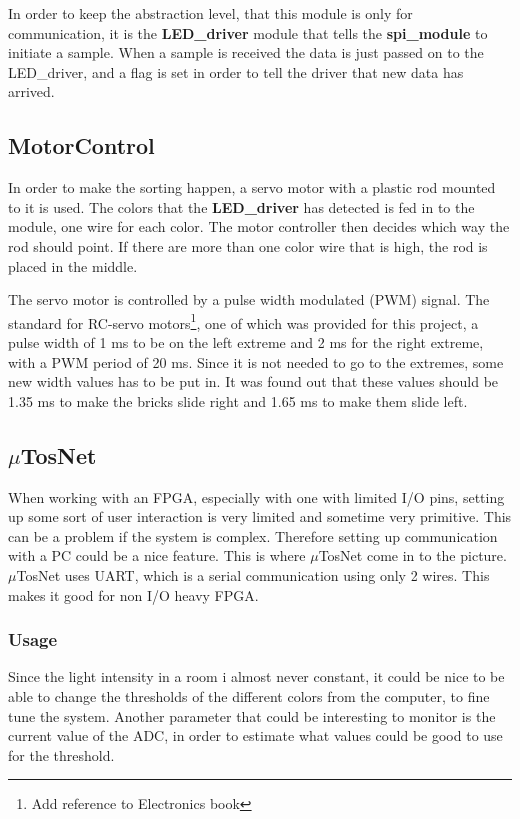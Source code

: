 In order to keep the abstraction level, that this module is only for communication, it is the \textbf{LED\_driver} module that tells the \textbf{spi\_module} to initiate a sample. When a sample is received the data is just passed on to the LED\_driver, and a flag is set in order to tell the driver that new data has arrived.

\subsection{MotorControl}
In order to make the sorting happen, a servo motor with a plastic rod mounted to it is used. The colors that the \textbf{LED\_driver} has detected is fed in to the module, one wire for each color. The motor controller then decides which way the rod should point. If there are more than one color wire that is high, the rod is placed in the middle. 

The servo motor is controlled by a pulse width modulated (PWM) signal. The standard for RC-servo motors\footnote{Add reference to Electronics book}, one of which was provided for this project, a pulse width of 1 ms to be on the left extreme and 2 ms for the right extreme, with a PWM period of 20 ms. Since it is not needed to go to the extremes, some new width values has to be put in. It was found out that these values should be 1.35 ms to make the bricks slide right and 1.65 ms to make them slide left.

\subsection{$\mu$TosNet}
When working with an FPGA, especially with one with limited I/O pins, setting up some sort of user interaction is very limited and sometime very primitive. This can be a problem if the system is complex. Therefore setting up communication with a PC could be a nice feature. This is where $\mu$TosNet come in to the picture. $\mu$TosNet uses UART, which is a serial communication using only 2 wires. This makes it good for non I/O heavy FPGA. 

\subsubsection{Usage}
Since the light intensity in a room i almost never constant, it could be nice to be able to change the thresholds of the different colors from the computer, to fine tune the system. Another parameter that could be interesting to monitor is the current value of the ADC, in order to estimate what values could be good to use for the threshold. 
